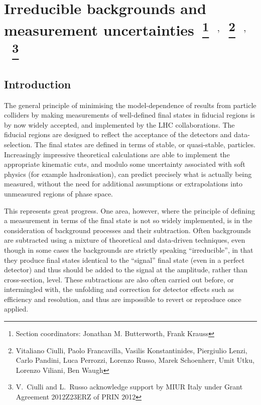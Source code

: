 \documentclass[11pt]{cernrep}
\begin{document}
 
\section{Irreducible backgrounds and measurement uncertainties~\protect\footnote{Section
  coordinators: Jonathan M. Butterworth, Frank Krauss }~$^{,}$~\protect\footnote{Vitaliano Ciulli, Paolo
  Francavilla, Vasilis Konstantinides, Piergiulio Lenzi, Carlo Pandini, Luca Perrozzi, Lorenzo Russo, Marek Schoenherr,
  Umit Utku, Lorenzo Viliani, Ben Waugh}~$^{,}$~\protect\footnote{V.~Ciulli and L.~Russo
  acknowledge support by MIUR Italy under Grant Agreement 2012Z23ERZ of PRIN 2012}\label{thisLH_bkgsub}}



\subsection{Introduction}
\label{sec:intro}

The general principle of minimising the model-dependence of results from particle colliders by making measurements of 
well-defined final states in fiducial regions is by now widely accepted, and implemented by the LHC collaborations. 
The fiducial regions are designed to reflect the acceptance of the detectors and data-selection. 
The final states are defined in terms of stable, or quasi-stable,
particles. Increasingly impressive theoretical calculations are able to implement the appropriate kinematic cuts, and
modulo some uncertainty associated with soft physics (for example hadronisation), can predict precisely what 
is actually being measured, without the need for additional assumptions or extrapolations into unmeasured regions of 
phase space.

This represents great progress. One area, however, where the principle of defining a measurement in terms of the final state
is not so widely implemented, is in the consideration of background processes and their subtraction. 
Often backgrounds are subtracted using a mixture of theoretical and data-driven techniques, 
even though in some cases the backgrounds are strictly speaking ``irreducible'', in that they produce final states 
identical to the ``signal'' final state (even in a perfect detector) and thus should be added to the signal 
at the amplitude, rather than cross-section, level. These subtractions are also often carried out before, or intermingled with, 
the unfolding and correction for detector effects such as efficiency and resolution, and thus are 
impossible to revert or reproduce once applied.
\end{document}
